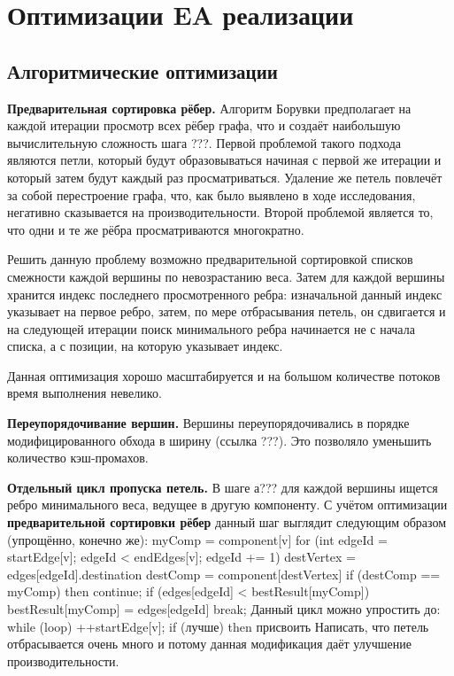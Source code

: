 \documentclass{article}
\begin{document}

\newpage
\section{Оптимизации EA реализации}

\subsection{Алгоритмические оптимизации}

\textbf{Предварительная сортировка рёбер.}
Алгоритм Борувки предполагает на каждой итерации просмотр всех рёбер графа, что и создаёт наибольшую вычислительную сложность шага ???. Первой проблемой такого подхода являются петли, который будут образовываться начиная с первой же итерации и который затем будут каждый раз просматриваться. Удаление же петель повлечёт за собой перестроение графа, что, как было выявлено в ходе исследования, негативно сказывается на производительности. Второй проблемой является то, что одни и те же рёбра просматриваются многократно.

Решить данную проблему возможно предварительной сортировкой списков смежности каждой вершины по невозрастанию веса. Затем для каждой вершины хранится индекс последнего просмотренного ребра: изначальной данный индекс указывает на первое ребро, затем, по мере отбрасывания петель, он сдвигается и на следующей итерации поиск минимального ребра начинается не с начала списка, а с позиции, на которую указывает индекс.

Данная оптимизация хорошо масштабируется и на большом количестве потоков время выполнения невелико.



\textbf{Переупорядочивание вершин.}
Вершины переупорядочивались в порядке модифицированного обхода в ширину (ссылка ???). Это позволяло уменьшить количество кэш-промахов.



\textbf{Отдельный цикл пропуска петель.}
В шаге а??? для каждой вершины ищется ребро минимального веса, ведущее в другую компоненту. С учётом оптимизации \textbf{предварительной сортировки рёбер} данный шаг выглядит следующим образом (упрощённо, конечно же):
myComp = component[v]
for (int edgeId = startEdge[v]; edgeId < endEdges[v]; edgeId += 1)
  destVertex = edges[edgeId].destination
  destComp = component[destVertex]
  if (destComp == myComp) then
    continue;
  if (edges[edgeId] < bestResult[myComp])
    bestResult[myComp] = edges[edgeId]
  break;
Данный цикл можно  упростить до:
while (loop) ++startEdge[v]; 
if (лучше) then присвоить
Написать, что петель отбрасывается очень много и потому данная модификация даёт улучшение производительности.
\end{document}
